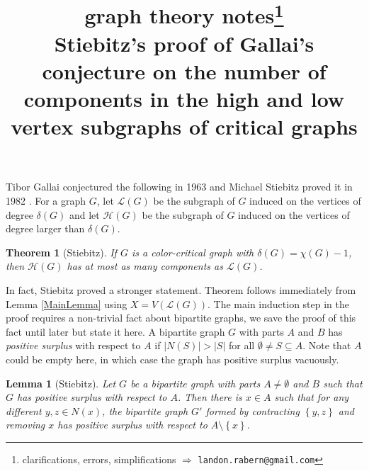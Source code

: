 \documentclass[12pt]{article}
\title{graph theory notes\thanks{clarifications, errors, simplifications $\Rightarrow$ \texttt{landon.rabern@gmail.com}}\\ \bigskip
Stiebitz's proof of Gallai's conjecture on the number of components in the high and low vertex subgraphs of critical graphs}
\date{}
\theoremstyle{plain}
\newtheorem{lem}[thm]{Lemma}
\newtheorem*{Theorem}{Theorem}
\theoremstyle{definition}
\theoremstyle{remark}
\newcommand{\fancy}[1]{\mathcal{#1}}
\renewcommand{\L}{\fancy{L}}
\newcommand{\set}[1]{\left\{ #1 \right\}}
\def\L{\fancy{L}}
\def\H{\fancy{H}}
\begin{document}
\maketitle

Tibor Gallai conjectured the following in 1963 \cite{gallai1963kritische, gallai1963kritische2} and Michael Stiebitz proved it in 1982 \cite{stiebitz1982proof}.  For a graph $G$,
let $\L(G)$ be the subgraph of $G$ induced on the vertices of degree $\delta(G)$ and let $\H(G)$ be the subgraph of $G$ induced on the vertices of degree larger than $\delta(G)$.

\begin{Theorem}[Stiebitz]
If $G$ is a color-critical graph with $\delta(G) = \chi(G) - 1$, then $\H(G)$ has at most as many components as $\L(G)$.
\end{Theorem}

In fact, Stiebitz proved a stronger statement.  Theorem follows immediately from Lemma \ref{MainLemma} using $X = V(\L(G))$.  The main induction step in the proof requires a non-trivial fact about bipartite graphs, we save the proof of this fact until later but state it here.  A bipartite graph $G$ with parts $A$ and $B$ has \emph{positive surplus} with respect to $A$ if $|N(S)| > |S|$ for all $\emptyset \ne S \subseteq A$.  Note that $A$ could be empty here, in which case the graph has positive surplus vacuously. 

\begin{lem}[Stiebitz]
Let $G$ be a bipartite graph with parts $A \ne \emptyset$ and $B$ such that $G$ has positive surplus with respect to $A$.   Then there is $x \in A$ such that for any different $y,z \in N(x)$, the bipartite graph $G'$ formed by contracting $\set{y,z}$ and removing $x$ has positive surplus with respect to $A \setminus \set{x}$.
\label{BipartiteLemma}
\end{lem}
\end{document}

